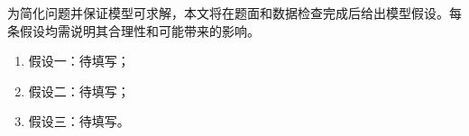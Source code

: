为简化问题并保证模型可求解，本文将在题面和数据检查完成后给出模型假设。每条假设均需说明其合理性和可能带来的影响。

\begin{enumerate}
  \item 假设一：待填写；
  \item 假设二：待填写；
  \item 假设三：待填写。
\end{enumerate}

